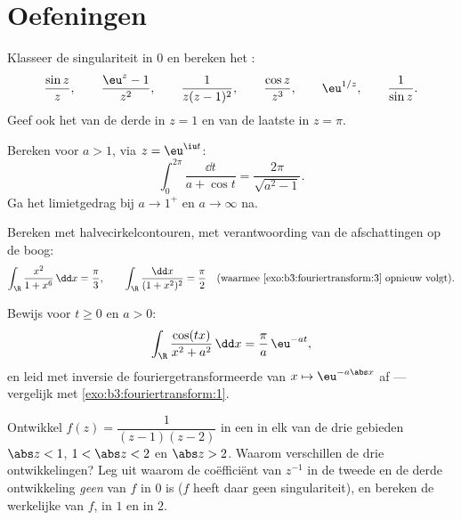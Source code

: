 \section{Oefeningen}

\begin{exercise}[$\star$]\label{exo:b3:residues:1}
Klasseer de singulariteit in $0$ en bereken het :
\[
\frac{\sin z}{z},\qquad
\frac{\eu^z - 1}{z^2},\qquad
\frac{1}{z(z-1)^2},\qquad
\frac{\cos z}{z^3},\qquad
\eu^{1/z},\qquad
\frac1{\sin z} .
\]
Geef ook het  van de derde in $z = 1$ en van de laatste in
$z = \pi$.
\end{exercise}

\begin{exercise}[$\star$]\label{exo:b3:residues:2}
Bereken voor $a > 1$, via $z = \eu^{\iu t}$:
\[
\int_0^{2\pi}\frac{\dd t}{a + \cos t}
= \frac{2\pi}{\sqrt{a^2 - 1}} .
\]
Ga het limietgedrag bij $a \to 1^+$ en $a \to \infty$ na.
\end{exercise}

\begin{exercise}[$\star\star$]\label{exo:b3:residues:3}
Bereken met halvecirkelcontouren, met verantwoording van de
afschattingen op de boog:
\[
\int_\R\frac{x^2}{1 + x^6}\,\dd x = \frac\pi3,
\qquad
\int_\R\frac{\dd x}{(1 + x^2)^{2}} = \frac\pi2
\quad\text{(waarmee \cref{exo:b3:fouriertransform:3} opnieuw
volgt)}.
\]
\end{exercise}

\begin{exercise}[$\star\star$]\label{exo:b3:residues:4}
Bewijs voor $t \geq 0$ en $a > 0$:
\[
\int_\R\frac{\cos(tx)}{x^2 + a^2}\,\dd x =
\frac{\pi}{a}\,\eu^{-at},
\]
en leid met inversie de fouriergetransformeerde van $x \mapsto
\eu^{-a\abs x}$ af --- vergelijk met
\cref{exo:b3:fouriertransform:1}.
\end{exercise}

\begin{exercise}[$\star\star$]\label{exo:b3:residues:5}
Ontwikkel $f(z) = \dfrac1{(z-1)(z-2)}$ in een  in elk
van de drie gebieden $\abs z < 1$, $1 < \abs z < 2$ en $\abs z >
2$. Waarom verschillen de drie ontwikkelingen? Leg uit waarom de
coëfficiënt van $z^{-1}$ in de tweede en de derde ontwikkeling
\emph{geen}  van $f$ in $0$ is ($f$ heeft daar geen
singulariteit), en bereken de werkelijke  van $f$, in $1$
en in $2$.
\end{exercise}

